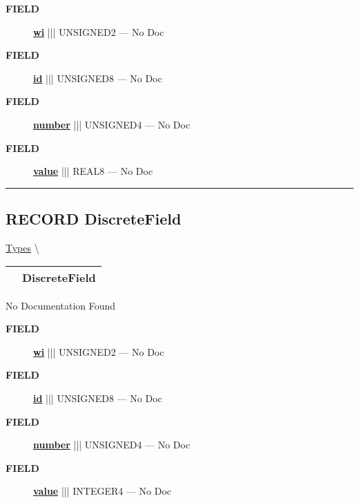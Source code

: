 \par
\begin{description}
\item [\colorbox{tagtype}{\color{white} \textbf{\textsf{FIELD}}}] \textbf{\underline{wi}} ||| UNSIGNED2 --- No Doc
\item [\colorbox{tagtype}{\color{white} \textbf{\textsf{FIELD}}}] \textbf{\underline{id}} ||| UNSIGNED8 --- No Doc
\item [\colorbox{tagtype}{\color{white} \textbf{\textsf{FIELD}}}] \textbf{\underline{number}} ||| UNSIGNED4 --- No Doc
\item [\colorbox{tagtype}{\color{white} \textbf{\textsf{FIELD}}}] \textbf{\underline{value}} ||| REAL8 --- No Doc
\end{description}





\rule{\linewidth}{0.5pt}
\subsection*{\textsf{\colorbox{headtoc}{\color{white} RECORD}
DiscreteField}}

\hypertarget{ecldoc:ml_core.types.discretefield}{}
\hspace{0pt} \hyperlink{ecldoc:ML_Core.Types}{Types} \textbackslash 

{\renewcommand{\arraystretch}{1.5}
\begin{tabularx}{\textwidth}{|>{\raggedright\arraybackslash}l|X|}
\hline
\hspace{0pt}\mytexttt{\color{red} } & \textbf{DiscreteField} \\
\hline
\end{tabularx}
}

\par





No Documentation Found







\par
\begin{description}
\item [\colorbox{tagtype}{\color{white} \textbf{\textsf{FIELD}}}] \textbf{\underline{wi}} ||| UNSIGNED2 --- No Doc
\item [\colorbox{tagtype}{\color{white} \textbf{\textsf{FIELD}}}] \textbf{\underline{id}} ||| UNSIGNED8 --- No Doc
\item [\colorbox{tagtype}{\color{white} \textbf{\textsf{FIELD}}}] \textbf{\underline{number}} ||| UNSIGNED4 --- No Doc
\item [\colorbox{tagtype}{\color{white} \textbf{\textsf{FIELD}}}] \textbf{\underline{value}} ||| INTEGER4 --- No Doc
\end{description}





